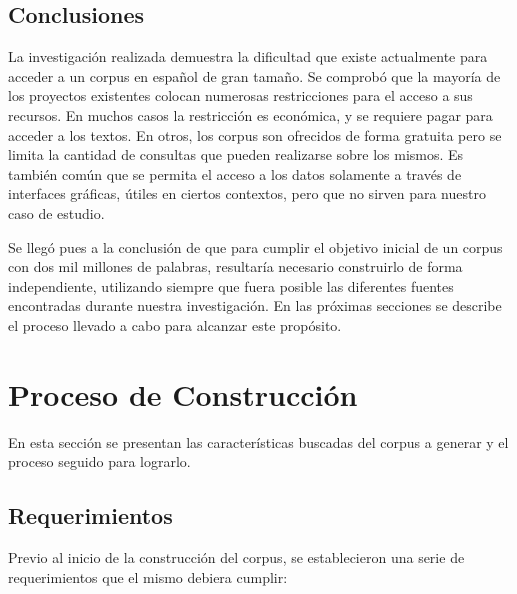 \subsection{Conclusiones}

La investigación realizada demuestra la dificultad que existe actualmente para acceder a un corpus en
español de gran tamaño. Se comprobó que la mayoría de los proyectos existentes colocan
numerosas restricciones para el acceso a sus recursos. En muchos casos la restricción es económica,
y se requiere pagar para acceder a los textos. En otros, los corpus son ofrecidos de forma gratuita pero
se limita la cantidad de consultas que pueden realizarse sobre los mismos. Es también común que se
permita el acceso a los datos solamente a través de interfaces gráficas, útiles en ciertos contextos, pero
que no sirven para nuestro caso de estudio.

Se llegó pues a la conclusión de que para cumplir el objetivo inicial de un corpus con dos mil millones
de palabras, resultaría necesario construirlo de forma independiente, utilizando siempre que fuera
posible las diferentes fuentes encontradas durante nuestra investigación. En las próximas secciones
se describe el proceso llevado a cabo para alcanzar este propósito.

\section{Proceso de Construcción}

En esta sección se presentan las características buscadas del corpus a generar y el proceso seguido
para lograrlo.

\subsection{Requerimientos}

Previo al inicio de la construcción del corpus, se establecieron una serie de requerimientos que el
mismo debiera cumplir:

